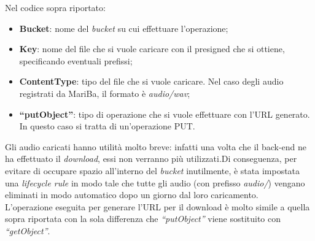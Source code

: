 		Nel codice sopra riportato:
		\begin{itemize}
			\item \textbf{Bucket}: nome del \emph{bucket} su cui effettuare l'operazione;
			\item \textbf{Key}: nome del file che si vuole caricare con il presigned che si ottiene, specificando eventuali prefissi;
			\item \textbf{ContentType}: tipo del file che si vuole caricare. Nel caso degli audio registrati da MariBa, il formato è \emph{audio/wav};
			\item \textbf{``putObject''}: tipo di operazione che si vuole effettuare con l'URL generato. In questo caso si tratta di un'operazione PUT.
		\end{itemize}
		
		Gli audio caricati hanno utilità molto breve: infatti una volta che il back-end ne ha effettuato il \emph{download}, 
		essi non verranno più utilizzati.Di conseguenza, per evitare di occupare spazio all'interno del \emph{bucket} inutilmente, è stata impostata una \emph{lifecycle rule} in modo tale che tutte gli audio (con prefisso \emph{audio/}) vengano eliminati in modo automatico dopo un giorno dal loro caricamento. \\
		
		\noindent  L'operazione eseguita per generare l'URL per il download è molto simile a quella sopra riportata con la sola differenza che \emph{``putObject''} viene sostituito con \emph{``getObject''}.
	
